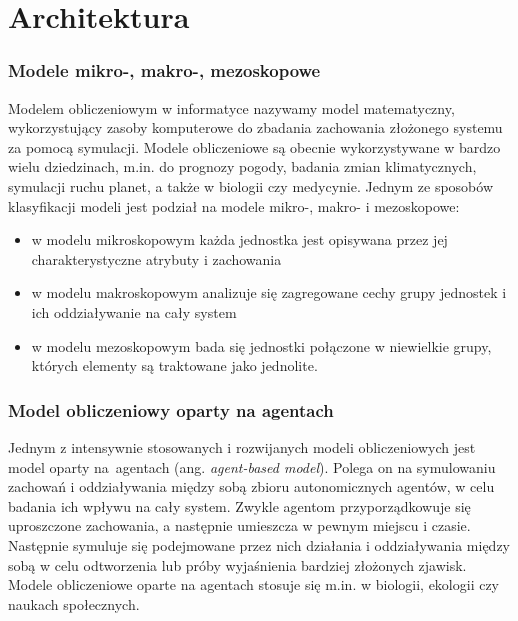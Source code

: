 \section{Architektura}

\subsubsection{Modele mikro-, makro-, mezoskopowe}
Modelem obliczeniowym w informatyce nazywamy model matematyczny, wykorzystujący zasoby komputerowe do zbadania zachowania złożonego systemu za pomocą symulacji\cite{model}. Modele obliczeniowe są obecnie wykorzystywane w bardzo wielu dziedzinach, m.in. do prognozy pogody, badania zmian klimatycznych, symulacji ruchu planet, a także w biologii czy medycynie. Jednym ze sposobów klasyfikacji modeli jest podział na modele mikro-, makro- i mezoskopowe\cite{micmac}:
\begin{itemize}
\item w modelu mikroskopowym każda jednostka jest opisywana przez jej charakterystyczne atrybuty i zachowania
\item w modelu makroskopowym analizuje się zagregowane cechy grupy jednostek i ich oddziaływanie na cały system
\item w modelu mezoskopowym bada się jednostki połączone w niewielkie grupy, których elementy są traktowane jako jednolite.
\end{itemize}
\subsubsection{Model obliczeniowy oparty na agentach}
Jednym z intensywnie stosowanych i rozwijanych modeli obliczeniowych jest model oparty na~agentach (ang. \textit{agent-based model}).
Polega on na symulowaniu zachowań i oddziaływania między sobą zbioru autonomicznych agentów, w celu badania ich wpływu na cały system\cite{agent-based}. Zwykle agentom przyporządkowuje się uproszczone zachowania, a następnie umieszcza w pewnym miejscu i czasie. Następnie symuluje się podejmowane przez nich działania i oddziaływania między sobą w celu odtworzenia lub próby wyjaśnienia bardziej złożonych zjawisk. Modele obliczeniowe oparte na agentach stosuje się m.in. w biologii, ekologii czy naukach społecznych.

